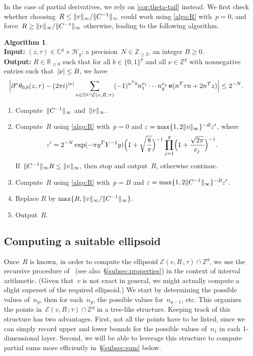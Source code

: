 \documentclass[12pt,oneside]{amsart}
\numberwithin{equation}{section}
\theoremstyle{definition}
\newtheorem{algorithm}[equation]{Algorithm}
\newcommand{\algoinput}[1]{~\\ \noindent\textbf{Input:} #1}
\newcommand{\algooutput}[1]{~\\ \noindent\textbf{Output:} #1}
\newcommand{\Z}{\mathbb{Z}}
\newcommand{\R}{\mathbb{R}}
\newcommand{\C}{\mathbb{C}}
\newcommand{\Half}{\mathcal{H}}
\newcommand{\eps}{\varepsilon}
\newcommand{\eld}[3]{\ensuremath{\mathcal{E}(#1, #2\,; #3)}}
\DeclareMathOperator{\e}{\mathbf{e}}
\DeclarePairedDelimiter{\abs}{|}{|}
\DeclarePairedDelimiter{\paren}{(}{)}
\DeclarePairedDelimiter{\norm}{\|}{\|}
\begin{document}
In the case of partial derivatives, we rely on \cref{cor:theta-tail}
instead. We first check whether
choosing~$R \leq \norm{v}_\infty/\norm{C^{-1}}_\infty$ could work using
\cref{algo:R} with~$p=0$, and
force~$R\geq \norm{v}_\infty/\norm{C^{-1}}_\infty$ otherwise, leading to the
following algorithm.

\begin{algorithm}
  \label{algo:compute-R-der}
  \algoinput{$(z,\tau)\in \C^g\times \Half_g$; a precision~$N\in \Z_{\geq 2}$,
    an integer $B\geq 0$}.  \algooutput{$R\in \R_{\geq 0}$ such that for all
    $b\in \{0,1\}^g$ and all $\nu\in \Z^g$ with nonnegative entries such
    that~$\abs{\nu}\leq B$, we have
    \begin{displaymath}
      \abs[\Big]{\partial^\nu\theta_{0,b}(z,\tau) - (2\pi i)^{\abs{\nu}} \sum_{n\in \Z^g \cap\eld{v}{R}{\tau}} (-1)^{n^T b} n_1^{\nu_1}\cdots n_g^{\nu_{g}} \e(n^T\tau n + 2n^T z)} \leq 2^{-N}.
    \end{displaymath}}
  \begin{enumerate}
  \item Compute~$\norm{C^{-1}}_\infty$ and~$\norm{v}_\infty$.
  \item Compute~$R$ using \cref{algo:R} with~$p = 0$ and $\eps = \max\{1, 2\norm{v}_\infty\}^{-B} \eps'$, where
    \begin{displaymath}
      \eps' = 2^{-N} \exp(-\pi y^T Y^{-1} y) \paren[\Big]{1 + \sqrt{\frac{8}{\pi}}}^{-1} \prod_{j=1}^g \paren[\Big]{1+\frac{\sqrt{2\pi}}{c_j}}^{-1}.
    \end{displaymath}
    If~$\norm{C^{-1}}_\infty R\leq \norm{v}_\infty$, then stop and output~$R$, otherwise continue.
  \item Compute~$R$ using \cref{algo:R} with~$p=B$ and
    $\eps = \max\{1, 2\norm{C^{-1}}_\infty\}^{-B} \eps'$.
  \item Replace $R$ by $\max\{R, \norm{v}_\infty/\norm{C^{-1}}_\infty\}$.
  \item Output~$R$.
  \end{enumerate}
\end{algorithm}


\subsection{Computing a suitable ellipsoid}
\label{subsec:compute-eld}

Once~$R$ is known, in order to compute the ellipsoid
$\eld{v}{R}{\tau}\cap\Z^g$, we use the recursive procedure of~\cite[Remark
p.\,9]{deconinckComputingRiemannTheta2004} (see also~§\ref{subsec:properties})
in the context of interval arithmetic. (Given that~$v$ is not exact in general,
we might actually compute a slight superset of the required ellipsoid.) We
start by determining the possible values of~$n_g$, then for each~$n_g$, the
possible values for~$n_{g-1}$, etc. This organizes the points
in~$\eld{v}{R}{\tau}\cap \Z^g$ in a tree-like structure. Keeping track of this
structure has two advantages. First, not all the points have to be listed,
since we can simply record upper and lower bounds for the possible values
of~$n_1$ in each 1-dimensional layer. Second, we will be able to leverage this
structure to compute partial sums more efficiently in~§\ref{subsec:sum} below.
\end{document}
